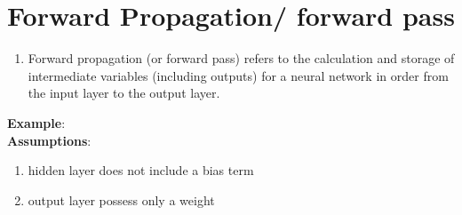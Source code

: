 \section{Forward Propagation/ forward pass \cite{dnn-1}} \label{Forward Propagation/ forward pass}


\begin{enumerate}[itemsep=0.1cm]
    \item Forward propagation (or forward pass) refers to the calculation and storage of intermediate variables (including outputs) for a neural network in order from the input layer to the output layer.

\end{enumerate}


\textbf{Example}: \\


\textbf{Assumptions}:
\begin{enumerate}
    \item hidden layer does not include a bias term
    \item output layer possess only a weight
\end{enumerate}

